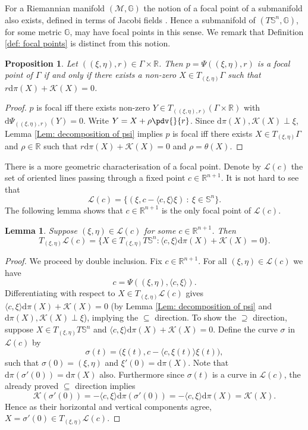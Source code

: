 \documentclass[12pt]{amsart}
\theoremstyle{plain}
\newtheorem{Lem}{Lemma}
\newtheorem{Prop}{Proposition}
\theoremstyle{definition}
\def\R{\mathbb{R}}
\def\S{\mathbb{S}}
\newcommand{\td}{\mathrm{d}}
\numberwithin{equation}{section}
\begin{document}
For a Riemannian manifold $(\mathcal{M},\mathbb{G})$ the notion of a focal point of a submanifold also exists, defined in terms of Jacobi fields \cite{DoCarmo92}. Hence a submanifold of $(T\S^n,\mathbb{G})$, for some metric $\mathbb{G}$, may have focal points in this sense. We remark that Definition \ref{def: focal points} is distinct from this notion.
\begin{Prop} \label{prop: characterisation of focal points}
    Let $((\xi,\eta),r)\in \Gamma \times \mathbb{R}$. Then $p=\Psi((\xi,\eta),r)$ is a focal point of $\Gamma$ if and only if there exists a non-zero $X\in T_{(\xi,\eta)}\Gamma$ such that $r\td\pi(X)+\mathcal{K}(X)=0$.
\end{Prop}
\begin{proof}
$p$ is focal iff there exists non-zero $Y\in T_{((\xi,\eta),r)}(\Gamma\times \R)$ with $\td\Psi_{((\xi,\eta),r)}(Y)=0$. Write $Y=X+\rho\pdv{}{r}$. Since $\td\pi(X),\mathcal{K}(X)\perp\xi$, Lemma \ref{Lem: decomposition of psi} implies $p$ is focal iff there exists $X\in T_{(\xi,\eta)}\Gamma$ and $\rho\in \mathbb{R}$ such that $r\td\pi(X)+\mathcal{K}(X)=0$ and $\rho=\theta(X)$. 
\end{proof}
There is a more geometric characterisation of a focal point. Denote by $\mathcal{L}(c)$ the set of oriented lines passing through a fixed point $c\in\mathbb{R}^{n+1}$. It is not hard to see that
\[
\mathcal{L}(c)=\{(\xi,c-\langle c,\xi\rangle\xi)~:~\xi\in\S^n\}.
\]
The following lemma shows that $c\in {\mathbb R}^{n+1}$ is the only focal point of $\mathcal{L}(c)$.
\begin{Lem}\label{Lem: tangent space of lines through a point}
    Suppose $(\xi,\eta)\in \mathcal{L}(c)$ for some $c\in\mathbb{R}^{n+1}$. Then
    \[
    T_{(\xi,\eta)}\mathcal{L}(c)=\{X\in T_{(\xi,\eta)}T\S^n: \langle c,\xi\rangle\td\pi(X)+\mathcal{K}(X)=0\}.
    \]
\end{Lem} \begin{proof}
We proceed by double inclusion. Fix $c\in\mathbb{R}^{n+1}$. For all $(\xi,\eta)\in\mathcal{L}(c)$ we have
\[
c=\Psi((\xi,\eta),\langle c,\xi\rangle).
\]
Differentiating with respect to $X\in T_{(\xi,\eta)}\mathcal{L}(c)$ gives $\langle c, \xi \rangle\td\pi(X)+\mathcal{K}(X)=0$ (by Lemma \ref{Lem: decomposition of psi} and $\td\pi(X),\mathcal{K}(X)\perp\xi$), implying the $\subseteq$ direction. To show the $\supseteq$ direction, suppose $X\in T_{(\xi,\eta)}T\S^n$ and $\langle c,\xi\rangle\td\pi(X)+\mathcal{K}(X)=0$. Define the curve $\sigma$ in $\mathcal{L}(c)$ by
\[
\sigma(t)=\big(\xi(t),c-\langle c,\xi(t)\rangle\xi(t)\big),
\]
such that $\sigma(0)=(\xi,\eta)$ and $\xi'(0)=\td\pi(X)$. Note that $\td\pi(\sigma'(0))=\td\pi(X)$ also. Furthermore since $\sigma(t)$ is a curve in $\mathcal{L}(c)$, the already proved $\subseteq$ direction implies
\[
\mathcal{K}(\sigma'(0))=-\langle c,\xi\rangle\td\pi(\sigma'(0))=-\langle c, \xi \rangle \td \pi(X)=\mathcal{K}(X).
\]
Hence as their horizontal and vertical components agree, $X=\sigma'(0)\in T_{(\xi,\eta)}\mathcal{L}(c)$.
\end{proof}
\end{document}
